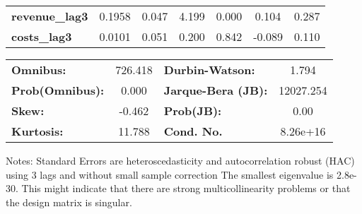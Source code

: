 \begin{center}
\begin{tabular}{lcccccc}
\textbf{revenue\_lag3}                   &       0.1958  &        0.047     &     4.199  &         0.000        &        0.104    &        0.287     \\
\textbf{costs\_lag3}                     &       0.0101  &        0.051     &     0.200  &         0.842        &       -0.089    &        0.110     \\
\bottomrule
\end{tabular}
\begin{tabular}{lclc}
\textbf{Omnibus:}       & 726.418 & \textbf{  Durbin-Watson:     } &     1.794  \\
\textbf{Prob(Omnibus):} &   0.000 & \textbf{  Jarque-Bera (JB):  } & 12027.254  \\
\textbf{Skew:}          &  -0.462 & \textbf{  Prob(JB):          } &      0.00  \\
\textbf{Kurtosis:}      &  11.788 & \textbf{  Cond. No.          } &  8.26e+16  \\
\bottomrule
\end{tabular}
\end{center}

Notes: \newline
 [1] Standard Errors are heteroscedasticity and autocorrelation robust (HAC) using 3 lags and without small sample correction \newline
 [2] The smallest eigenvalue is 2.8e-30. This might indicate that there are \newline
 strong multicollinearity problems or that the design matrix is singular.